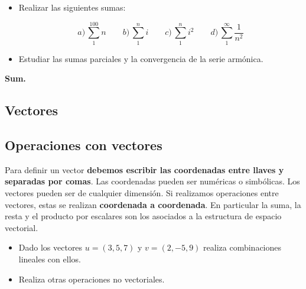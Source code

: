 \documentclass[a4paper,10pt, draft]{article}
\newenvironment{capitulo}{\begin{tcolorbox}[colback=red!5!white,colframe=red!75!black]}{\end{tcolorbox}\bigskip}
\newenvironment{ejer}{\begin{tcolorbox}[center title, title=Ejercicios,
fonttitle=\sffamily\bfseries,colback=blue!5,colframe=orange]}{\end{tcolorbox}}
\newenvironment{funciones}{\begin{tcolorbox}[center title, title=Nuevas funciones, fonttitle=\sffamily\bfseries, colback=green!5!white,colframe=red!75!black]}{\end{tcolorbox}\bigskip}
\begin{document}
\begin{ejer}

\begin{itemize}

\item Realizar las siguientes sumas:

$$
a)\, \sum_1^{100} n \qquad b)\,\sum_1^n i \qquad c)\,\sum_1^n i^2 \qquad d)\, \sum_1^\infty\frac{1}{n^2}
$$


\item Estudiar las sumas parciales y la convergencia de la serie armónica.


\end{itemize}

\enlargethispage{2cm}

\end{ejer}  

\begin{funciones}

\textbf{Sum.}


\end{funciones}




\newpage

\begin{capitulo}

\section{Vectores}

\end{capitulo}


\subsection{Operaciones con vectores}


Para definir un vector \textbf{debemos escribir las coordenadas entre llaves  y separadas por comas}. Las coordenadas pueden ser numéricas o simbólicas. Los vectores pueden ser de cualquier dimensión.  Si realizamos operaciones entre vectores, estas se realizan \textbf{coordenada a coordenada}. En particular la suma, la resta y el producto por escalares son los asociados a la estructura de espacio vectorial.

\begin{ejer}

\begin{itemize}

\item Dado los vectores $u=(3,5,7)$ y $v=(2,-5,9)$ realiza combinaciones lineales con ellos.

\item Realiza otras operaciones \guillemotleft no vectoriales\guillemotright.


\end{itemize}

\end{ejer}  
\end{document}
